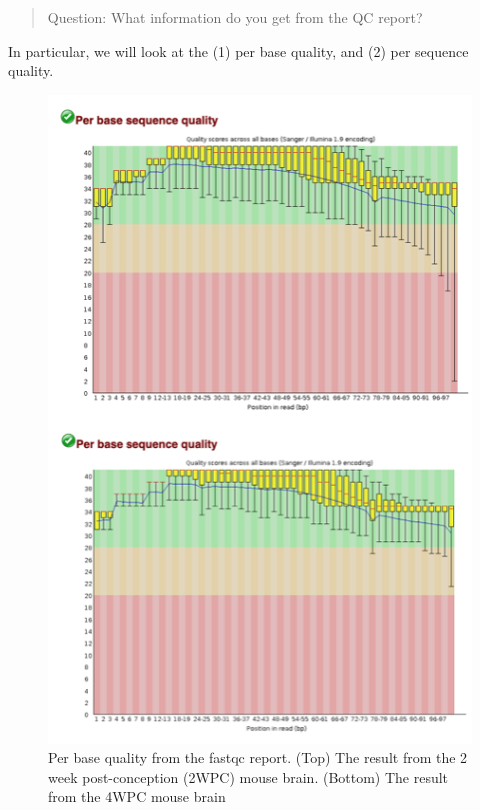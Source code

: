 \documentclass[
]{book}
\begin{document}
\begin{quote}
Question: What information do you get from the QC report?
\end{quote}

In particular, we will look at the (1) per base quality, and (2) per sequence quality.

\begin{figure}
\centering
\includegraphics{figures/per_base_quality.png}
\caption{Per base quality from the fastqc report. (Top) The result from the 2 week post-conception (2WPC) mouse brain. (Bottom) The result from the 4WPC mouse brain}
\end{figure}
\end{document}

